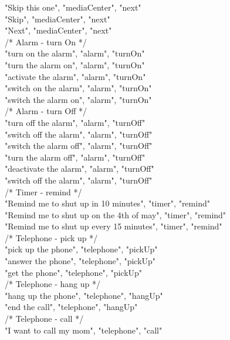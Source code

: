 \documentclass[twoside]{supsistudent}
\begin{document}
\begin{appendices}
        "Skip this one", "mediaCenter", "next"\\
        "Skip", "mediaCenter", "next"\\
        "Next", "mediaCenter", "next"\\
        /*
        Alarm - turn On
         */\\
        "turn on the alarm", "alarm", "turnOn"\\
        "turn the alarm on", "alarm", "turnOn"\\
        "activate the alarm", "alarm", "turnOn"\\
        "switch on the alarm", "alarm", "turnOn"\\
        "switch the alarm on", "alarm", "turnOn"\\
        /*
        Alarm - turn Off
         */\\
        "turn off the alarm", "alarm", "turnOff"\\
        "switch off the alarm", "alarm", "turnOff"\\
        "switch the alarm off", "alarm", "turnOff"\\
        "turn the alarm off", "alarm", "turnOff"\\
        "deactivate the alarm", "alarm", "turnOff"\\
        "switch off the alarm", "alarm", "turnOff"\\
        /*
        Timer - remind
         */\\
        "Remind me to shut up in 10 minutes", "timer", "remind"\\
        "Remind me to shut up on the 4th of may", "timer", "remind"\\
        "Remind me to shut up every 15 minutes", "timer", "remind"\\
        /*
        Telephone - pick up
         */\\
        "pick up the phone", "telephone", "pickUp"\\
        "answer the phone", "telephone", "pickUp"\\
        "get the phone", "telephone", "pickUp"\\
         /*
        Telephone - hang up
         */\\
        "hang up the phone", "telephone", "hangUp"\\
        "end the call", "telephone", "hangUp"\\
        /*
        Telephone - call
         */\\
        "I want to call my mom", "telephone", "call"\\

\end{appendices}
\end{document}
